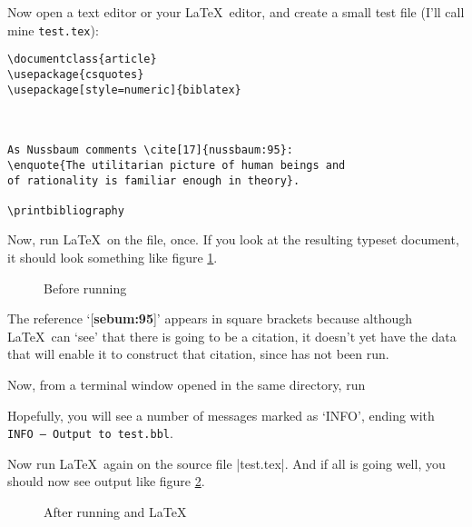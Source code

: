 Now open a text editor or your \LaTeX\ editor, and create a small test
file (I'll call mine \texttt{test.tex}):

\begin{verbatim}
\documentclass{article}
\usepackage{csquotes}
\usepackage[style=numeric]{biblatex}



As Nussbaum comments \cite[17]{nussbaum:95}: 
\enquote{The utilitarian picture of human beings and 
of rationality is familiar enough in theory}.

\printbibliography

\end{verbatim}

Now, run \LaTeX\ on the file, once. If you look at the resulting
typeset document, it should look something like figure
\ref{nussbaum1}.

\begin{figure}
\caption{Before running }\label{nussbaum1}
\end{figure}

The reference `[\textbf{sebum:95}]' appears in square brackets
because although \LaTeX\ can `see' that there is going to be a
citation, it doesn't yet have the data that will enable it to
construct that citation, since  has not been run.

Now, from a terminal window opened in the same directory, run

Hopefully, you will see a number of messages marked as `INFO', ending
with \texttt{INFO -- Output to test.bbl}.

Now run \LaTeX\ again on the source file |test.tex|. And if all is
going well, you should now see output like figure \ref{nussbaum2}.

\begin{figure}
\caption{After running  and \LaTeX}\label{nussbaum2}
\end{figure}

